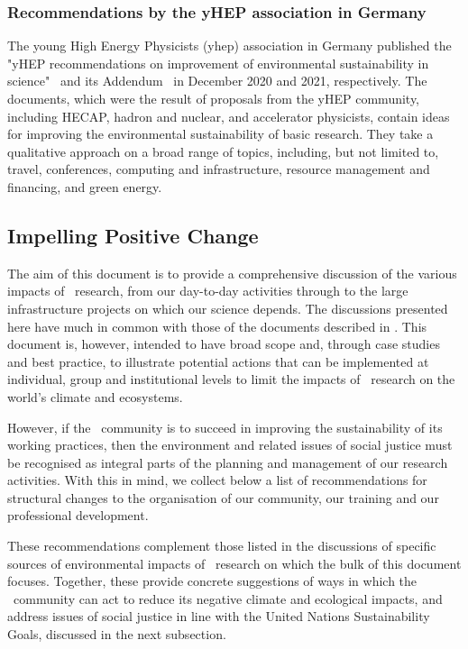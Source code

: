 \documentclass[../SustainableHEP.tex]{subfiles}
\begin{document}
\subsubsection{Recommendations by the yHEP association in Germany}

The young High Energy Physicists (\acrshort{yhep}) association in Germany published the "yHEP recommendations on improvement of environmental sustainability in science"~\cite{yHEP1} and its Addendum~\cite{yHEP2} in December 2020 and 2021, respectively. The documents, which were the result of proposals from the yHEP community, including HECAP, hadron and nuclear, and accelerator physicists, contain ideas for improving the environmental sustainability of basic research. They take a qualitative approach on a broad range of topics, including, but not limited to, travel, conferences, computing and infrastructure, resource management and financing, and green energy. 


\subsection{Impelling Positive Change}

The aim of this document is to provide a comprehensive discussion of the various impacts of \ACR\ research, from our day-to-day activities through to the large infrastructure projects on which our science depends. The discussions presented here have much in common with those of the documents described in . This document is, however, intended to have broad scope and, through case studies and best practice, to illustrate potential actions that can be implemented at individual, group and institutional levels to limit the impacts of \ACR\ research on the world's climate and ecosystems.

However, if the \ACR\ community is to succeed in improving the sustainability of its working practices, then the environment and related issues of social justice must be recognised as integral parts of the planning and management of our research activities. With this in mind, we collect below a list of recommendations for structural changes to the organisation of our community, our training and our professional development.

These recommendations complement those listed in the discussions of specific sources of environmental impacts of \ACR\ research on which the bulk of this document focuses. Together, these provide concrete suggestions of ways in which the \ACR\ community can act to reduce its negative climate and ecological impacts, and address issues of social justice in line with the United Nations Sustainability Goals, discussed in the next subsection.
\end{document}
